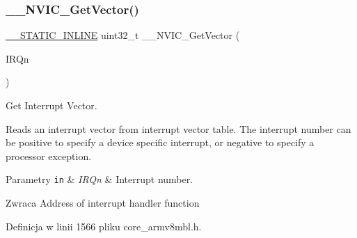 \mbox{\label{group___c_m_s_i_s___core___n_v_i_c_functions_ga44b665d2afb708121d9b10c76ff00ee5}} 
\subsubsection{\texorpdfstring{\+\_\+\+\_\+\+N\+V\+I\+C\+\_\+\+Get\+Vector()}{\_\_NVIC\_GetVector()}}
{\footnotesize\ttfamily \hyperlink{cmsis__iccarm_8h_aba87361bfad2ae52cfe2f40c1a1dbf9c}{\+\_\+\+\_\+\+S\+T\+A\+T\+I\+C\+\_\+\+I\+N\+L\+I\+NE} uint32\+\_\+t \+\_\+\+\_\+\+N\+V\+I\+C\+\_\+\+Get\+Vector (\begin{DoxyParamCaption}\item[{\hyperlink{group___peripheral__interrupt__number__definition_ga7e1129cd8a196f4284d41db3e82ad5c8}{I\+R\+Qn\+\_\+\+Type}}]{I\+R\+Qn }\end{DoxyParamCaption})}



Get Interrupt Vector. 

Reads an interrupt vector from interrupt vector table. The interrupt number can be positive to specify a device specific interrupt, or negative to specify a processor exception. 
\begin{DoxyParams}[1]{Parametry}
\mbox{\tt in}  & {\em I\+R\+Qn} & Interrupt number. \\
\hline
\end{DoxyParams}
\begin{DoxyReturn}{Zwraca}
Address of interrupt handler function 
\end{DoxyReturn}


Definicja w linii 1566 pliku core\+\_\+armv8mbl.\+h.

\mbox{\label{group___c_m_s_i_s___core___n_v_i_c_functions_gaabefdd4b790b9a7308929938c0c1e1ad}} 
